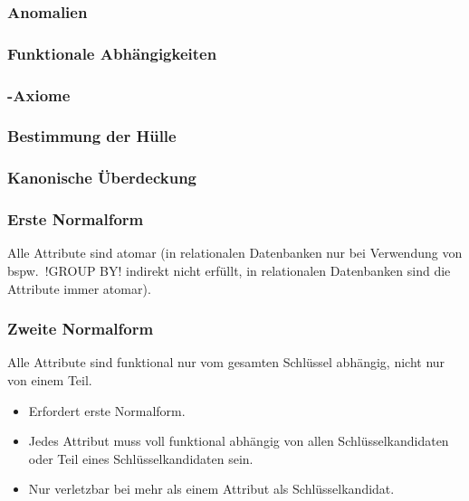 \subsubsection{Anomalien}


\subsubsection{Funktionale Abhängigkeiten}


\subsubsection{\protect{}-Axiome}


\subsubsection{Bestimmung der Hülle}


\subsubsection{Kanonische Überdeckung}


\subsubsection{Erste Normalform}

Alle Attribute sind atomar (in relationalen Datenbanken nur bei Verwendung von bspw.~\sqli!GROUP BY! indirekt nicht erfüllt, in relationalen Datenbanken sind die Attribute immer atomar).


\subsubsection{Zweite Normalform}

Alle Attribute sind funktional nur vom gesamten Schlüssel abhängig,
nicht nur von einem Teil.
\begin{itemize}
\item Erfordert erste Normalform.
\item Jedes Attribut muss voll funktional abhängig von allen Schlüsselkandidaten
oder Teil eines Schlüsselkandidaten sein.
\item Nur verletzbar bei mehr als einem Attribut als Schlüsselkandidat.
\end{itemize}

